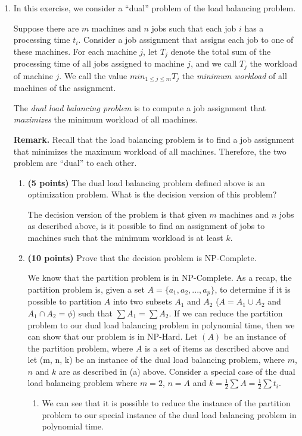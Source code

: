 \documentclass[paper=a4, fontsize=11pt]{scrartcl} %
\numberwithin{figure}{section} %
\numberwithin{table}{section} %
\begin{document}
\begin{enumerate}
\item In this exercise, we consider a \enquote{dual} problem of the load balancing problem.

Suppose there are $m$ machines and $n$ jobs such that each job $i$ has a processing time $t_i$.
Consider a job assignment that assigns each job to one of these machines. For each machine
$j$, let $T_j$ denote the total sum of the processing time of all jobs assigned to machine $j$, and
we call $T_j$ the workload of machine $j$. We call the value $min_{1 \leq j \leq m} T_j$ the \textit{minimum workload} of all machines of the assignment.

The \textit{dual load balancing problem} is to compute a job assignment that \textit{maximizes} the minimum
workload of all machines.

\textbf{Remark.} Recall that the load balancing problem is to find a job assignment that minimizes
the maximum workload of all machines. Therefore, the two problem are \enquote{dual} to each other.
\begin{enumerate}
\item \textbf{(5 points)} The dual load balancing problem defined above is an optimization problem. What is the decision version of this problem?

The decision version of the problem is that given $m$ machines and $n$ jobs as described above, is it possible to find an assignment of jobs to machines such that the minimum workload is at least $k$.

\item \textbf{(10 points)} Prove that the decision problem is NP-Complete.

We know that the partition problem is in NP-Complete. As a recap, the partition problem is, given a set $A=\{a_1, a_2,...,a_p\}$, to determine if it is possible to partition $A$ into two subsets $A_1$ and $A_2$ ($A=A_1 \cup A_2$ and $A_1 \cap A_2 = \phi$) such that $\sum A_1 = \sum A_2$. If we can reduce the partition problem to our dual load balancing problem in polynomial time, then we can show that our problem is in NP-Hard. Let $(A)$ be an instance of the partition problem, where $A$ is a set of items as described above and let (m, n, k) be an instance of the dual load balancing problem, where $m$, $n$ and $k$ are as described in (a) above. Consider a special case of the dual load balancing problem where $m=2$, $n=A$ and $k = \frac{1}{2} \sum A = \frac{1}{2} \sum t_i$.
\begin{enumerate}
\item We can see that it is possible to reduce the instance of the partition problem to our special instance of the dual load balancing problem in polynomial time.


\end{enumerate}
\end{enumerate}
\end{enumerate}
\end{document}
